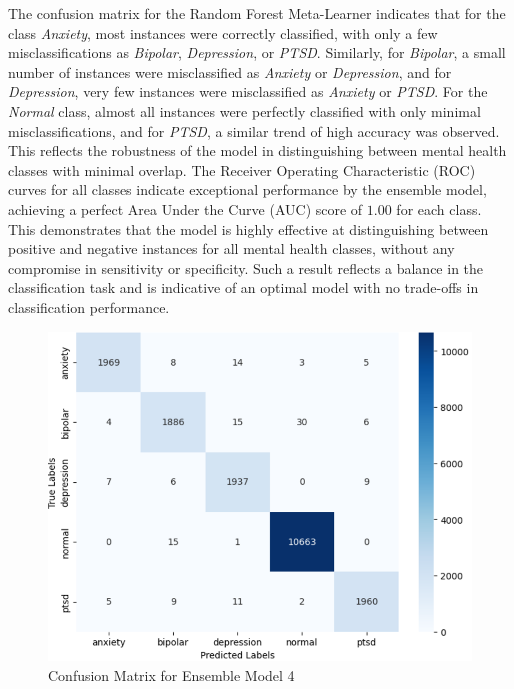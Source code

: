 \noindent
The confusion matrix for the Random Forest Meta-Learner indicates that for the class \textit{Anxiety}, most instances were correctly classified, with only a few misclassifications as \textit{Bipolar}, \textit{Depression}, or \textit{PTSD}. Similarly, for \textit{Bipolar}, a small number of instances were misclassified as \textit{Anxiety} or \textit{Depression}, and for \textit{Depression}, very few instances were misclassified as \textit{Anxiety} or \textit{PTSD}. For the \textit{Normal} class, almost all instances were perfectly classified with only minimal misclassifications, and for \textit{PTSD}, a similar trend of high accuracy was observed. This reflects the robustness of the model in distinguishing between mental health classes with minimal overlap. The Receiver Operating Characteristic (ROC) curves for all classes indicate exceptional performance by the ensemble model, achieving a perfect Area Under the Curve (AUC) score of $1.00$ for each class. This demonstrates that the model is highly effective at distinguishing between positive and negative instances for all mental health classes, without any compromise in sensitivity or specificity. Such a result reflects a balance in the classification task and is indicative of an optimal model with no trade-offs in classification performance.


\begin{figure}[h!]  
    \centering
    \includegraphics[width=1.0\textwidth]{Images/EM RF CM.png}  
    \caption{Confusion Matrix for Ensemble Model 4}
    \label{dfdl1244883}  %
\end{figure}


